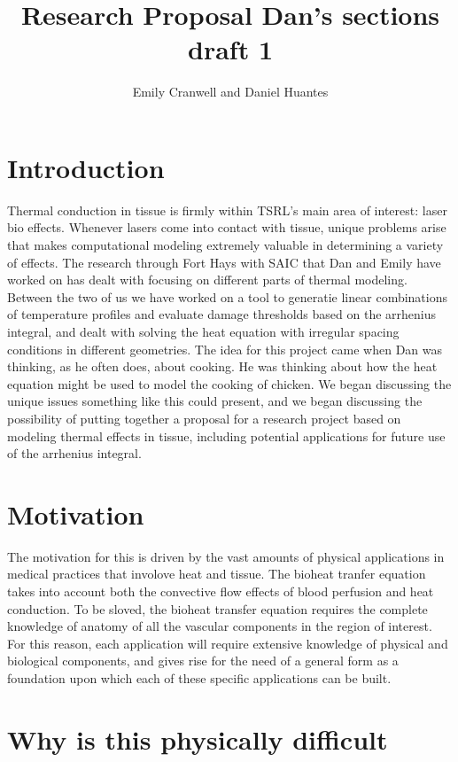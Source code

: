 \documentclass[12pt]{article}
\begin{document}
\title{Research Proposal
\large Dan's sections draft 1}
\author{Emily Cranwell and Daniel Huantes}
\maketitle
\section{Introduction}
Thermal conduction in tissue is firmly within TSRL's main area of interest: laser bio effects. Whenever lasers come into contact with tissue, unique problems arise that makes computational modeling extremely valuable in determining a variety of effects. The research through Fort Hays with SAIC that Dan and Emily have worked on has dealt with focusing on different parts of thermal modeling. Between the two of us we have worked on a tool to generatie linear combinations of temperature profiles and evaluate damage thresholds based on the arrhenius integral, and dealt with solving the heat equation with irregular spacing conditions in different geometries. The idea for this project came when Dan was thinking, as he often does, about cooking. He was thinking about how the heat equation might be used to model the cooking of chicken. We began discussing the unique issues something like this could present, and we began discussing the possibility of putting together a proposal for a research project based on modeling thermal effects in tissue, including potential applications for future use of the arrhenius integral.

\section{Motivation}
\indent The motivation for this is driven by the vast amounts of physical applications in medical practices that involove heat and tissue. The bioheat tranfer equation takes into account both the convective flow effects of blood perfusion and heat conduction. To be sloved, the bioheat transfer equation requires the complete knowledge of anatomy of all the vascular components in the region of interest. For this reason, each application will require extensive knowledge of physical and biological components, and gives rise for the need of a general form as a foundation upon which each of these specific applications can be built. 

\section{Why is this physically difficult}
\end{document}
